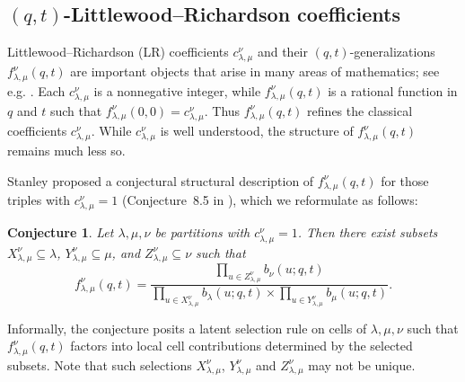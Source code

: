\documentclass{article}
\theoremstyle{plain}
\newtheorem{conjecture}[theorem]{Conjecture}
\theoremstyle{definition}
\theoremstyle{remark}
\begin{document}
    \subsection{$(q,t)$-Littlewood--Richardson coefficients}
    Littlewood--Richardson (LR) coefficients $c^\nu_{\lambda,\mu}$ and their $(q,t)$-generalizations
    $f^\nu_{\lambda,\mu}(q,t)$ are important objects that arise in many areas of mathematics; see e.g. \cite{LittlewoodRichardson1934,Macdonald1995,KnutsonTao1999,Vakil2006}.
    Each $c^\nu_{\lambda,\mu}$ is a nonnegative integer, while $f^\nu_{\lambda,\mu}(q,t)$ is a rational function in $q$ and $t$ such that $f^\nu_{\lambda,\mu}(0,0)=c^\nu_{\lambda,\mu}$.
    Thus $f^\nu_{\lambda,\mu}(q,t)$ refines the classical coefficients $c^\nu_{\lambda,\mu}$.
    While $c^\nu_{\lambda,\mu}$ is well understood, the structure of $f^\nu_{\lambda,\mu}(q,t)$ remains much less so.

    Stanley proposed a conjectural structural description of $f^\nu_{\lambda,\mu}(q,t)$
    for those triples with $c^\nu_{\lambda,\mu}=1$ (Conjecture~8.5 in \cite{Stanley1989}), which we reformulate as follows:
    \begin{conjecture} \label{conj:stanley_conjecture}
        Let $\lambda,\mu,\nu$ be partitions with $c^\nu_{\lambda,\mu}=1$. Then there exist subsets
        $X^\nu_{\lambda,\mu}\subseteq\lambda$, $Y^\nu_{\lambda,\mu}\subseteq\mu$, and
        $Z^\nu_{\lambda,\mu}\subseteq\nu$ such that
        \begin{equation} \label{eq:f_nlm-form}
            f^\nu_{\lambda,\mu}(q,t) =
            \dfrac{\prod_{u\in Z^\nu_{\lambda,\mu}} b_\nu(u;q,t)}
                  {\prod_{u\in X^\nu_{\lambda,\mu}} b_\lambda(u;q,t)
                   \times\prod_{u\in Y^\nu_{\lambda,\mu}} b_\mu(u;q,t)}.
        \end{equation}
    \end{conjecture}
    Informally, the conjecture posits a latent selection rule on cells of $\lambda,\mu,\nu$ such that $f^\nu_{\lambda,\mu}(q,t)$ factors into local cell contributions determined by the selected subsets.
    Note that such selections $X^\nu_{\lambda,\mu}$, $Y^\nu_{\lambda,\mu}$ and $Z^\nu_{\lambda,\mu}$ may not be unique.
\end{document}
